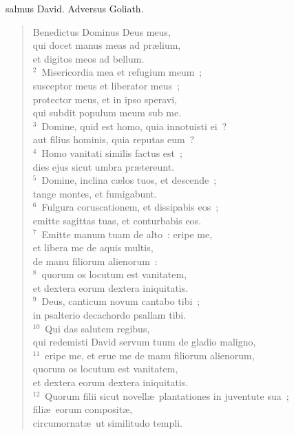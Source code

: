\bchapter
{}salmus David. Adversus Goliath. \begin{flushleft}\begin{verse}\vspace{6pt}Benedictus Dominus Deus meus,\\ qui docet manus meas ad pr\ae lium,\\ et digitos meos ad bellum.\\
${}^{2}$~Misericordia mea et refugium meum~;\\ susceptor meus et liberator meus~;\\ protector meus, et in ipso speravi,\\ qui subdit populum meum sub me.\\
${}^{3}$~Domine, quid est homo, quia innotuisti ei~?\\ aut filius hominis, quia reputas eum~?\\
${}^{4}$~Homo vanitati similis factus est~;\\ dies ejus sicut umbra pr\ae tereunt.\\
${}^{5}$~Domine, inclina c\ae los tuos, et descende~;\\ tange montes, et fumigabunt.\\
${}^{6}$~Fulgura coruscationem, et dissipabis eos~;\\ emitte sagittas tuas, et conturbabis eos.\\
${}^{7}$~Emitte manum tuam de alto~: eripe me,\\ et libera me de aquis multis,\\ de manu filiorum alienorum~:\\
${}^{8}$~quorum os locutum est vanitatem,\\ et dextera eorum dextera iniquitatis.\\
${}^{9}$~Deus, canticum novum cantabo tibi~;\\ in psalterio decachordo psallam tibi.\\
${}^{10}$~Qui das salutem regibus,\\ qui redemisti David servum tuum de gladio maligno,\\
${}^{11}$~eripe me, et erue me de manu filiorum alienorum,\\ quorum os locutum est vanitatem,\\ et dextera eorum dextera iniquitatis.\\
${}^{12}$~Quorum filii sicut novell\ae\ plantationes in juventute sua~;\\ fili\ae\ eorum composit\ae ,\\ circumornat\ae\ ut similitudo templi.\\

\end{verse}
\end{flushleft}
